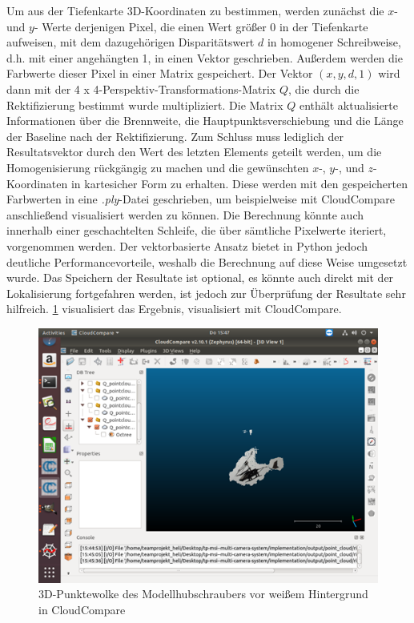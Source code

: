 Um aus der Tiefenkarte 3D-Koordinaten zu bestimmen, werden zunächst die $x$- und $y$- Werte derjenigen Pixel, die einen Wert größer 0 in der Tiefenkarte aufweisen, mit dem dazugehörigen Disparitätswert $d$ in homogener Schreibweise, d.h. mit einer angehängten 1, in einen Vektor geschrieben. Außerdem werden die Farbwerte dieser Pixel in einer Matrix gespeichert. Der Vektor $(x, y, d, 1)$ wird dann mit der 4 x 4-Perspektiv-Transformations-Matrix $Q$, die durch die Rektifizierung bestimmt wurde multipliziert. Die Matrix $Q$ enthält aktualisierte Informationen über die Brennweite, die Hauptpunktsverschiebung und die Länge der Baseline nach der Rektifizierung. Zum Schluss muss lediglich der Resultatsvektor durch den Wert des letzten Elements geteilt werden, um die Homogenisierung rückgängig zu machen und die gewünschten $x$-, $y$-, und $z$-Koordinaten in kartesicher Form zu erhalten. Diese werden mit den gespeicherten Farbwerten in eine \textit{.ply}-Datei geschrieben, um beispielweise mit CloudCompare anschließend visualisiert werden zu können.\newline
Die Berechnung könnte auch innerhalb einer geschachtelten Schleife, die über sämtliche Pixelwerte iteriert, vorgenommen werden. Der vektorbasierte Ansatz bietet in Python jedoch deutliche Performancevorteile, weshalb die Berechnung auf diese Weise umgesetzt wurde. Das Speichern der Resultate ist optional, es könnte auch direkt mit der Lokalisierung fortgefahren werden, ist jedoch zur Überprüfung der Resultate sehr hilfreich. \ref{fig:cloudresult} visualisiert das Ergebnis, visualisiert mit CloudCompare.

\begin{figure}[H]
	\includegraphics[scale=1.0]{bilder/cloud_result}
	\caption[3D-Punktewolke des Modellhubschraubers vor weißem Hintergrund in CloudCompare]{3D-Punktewolke des Modellhubschraubers vor weißem Hintergrund in CloudCompare}
	\label{fig:cloudresult}%
\end{figure}

